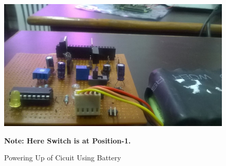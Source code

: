\documentclass[11pt,a4paper]{article}
\begin{document}
\newpage
	\begin{figure}[h!]
		\includegraphics[scale=0.3]{im1.jpg}
		\centering
		\caption{Powering Up of Cicuit Using Battery}
		\textbf{Note: Here Switch is at Position-1.}
		

\end{figure}
\end{document}
